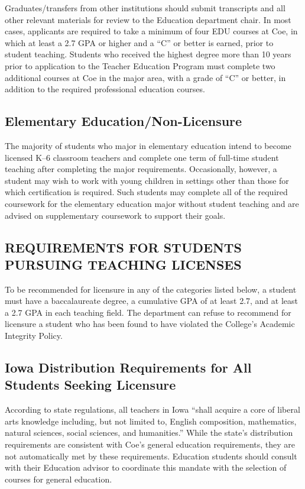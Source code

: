 \documentclass[
  letterpaper,
]{scrbook}
\begin{document}
Graduates/transfers from other institutions should submit transcripts
and all other relevant materials for review to the Education department
chair. In most cases, applicants are required to take a minimum of four
EDU courses at Coe, in which at least a 2.7 GPA or higher and a ``C'' or
better is earned, prior to student teaching. Students who received the
highest degree more than 10 years prior to application to the Teacher
Education Program must complete two additional courses at Coe in the
major area, with a grade of ``C'' or better, in addition to the required
professional education courses.

\subsection{Elementary
Education/Non-Licensure}\label{elementary-educationnon-licensure}

The majority of students who major in elementary education intend to
become licensed K--6 classroom teachers and complete one term of
full-time student teaching after completing the major requirements.
Occasionally, however, a student may wish to work with young children in
settings other than those for which certification is required. Such
students may complete all of the required coursework for the elementary
education major without student teaching and are advised on
supplementary coursework to support their goals.

\subsection{REQUIREMENTS FOR STUDENTS PURSUING TEACHING
LICENSES}\label{requirements-for-students-pursuing-teaching-licenses}

To be recommended for licensure in any of the categories listed below, a
student must have a baccalaureate degree, a cumulative GPA of at least
2.7, and at least a 2.7 GPA in each teaching field. The department can
refuse to recommend for licensure a student who has been found to have
violated the College's Academic Integrity Policy.

\subsection{Iowa Distribution Requirements for All Students Seeking
Licensure}\label{iowa-distribution-requirements-for-all-students-seeking-licensure}

According to state regulations, all teachers in Iowa ``shall acquire a
core of liberal arts knowledge including, but not limited to, English
composition, mathematics, natural sciences, social sciences, and
humanities.'' While the state's distribution requirements are consistent
with Coe's general education requirements, they are not automatically
met by these requirements. Education students should consult with their
Education advisor to coordinate this mandate with the selection of
courses for general education.
\end{document}
